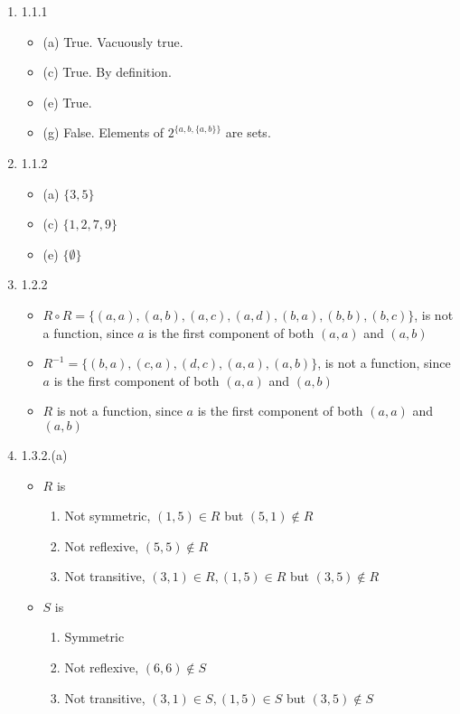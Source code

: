 \documentclass[10pt,a4paper]{article}
\begin{document}
\begin{enumerate}
	\item 1.1.1
	\begin{itemize}
		\item (a) True. Vacuously true.
		\item (c) True. By definition.
		\item (e) True.
		\item (g) False. Elements of $2^{\{a,b,\{a,b\}\}}$ are sets.
	\end{itemize}
	\item 1.1.2
	\begin{itemize}
		\item (a) $\{3,5\}$
		\item (c) $\{1,2,7,9\}$
		\item (e) $\{\emptyset\}$
	\end{itemize}
	\item 1.2.2
	\begin{itemize}
	\item $R\circ R=\{(a,a),(a,b),(a,c),(a,d),(b,a),(b,b),(b,c)\}$, is not a function, since $a$ is the first component of both $(a,a)$ and $(a,b)$
	\item $R^{-1}=\{(b,a),(c,a),(d,c),(a,a),(a,b)\}$, is not a function, since $a$ is the first component of both $(a,a)$ and $(a,b)$
	\item $R$ is not a function, since $a$ is the first component of both $(a,a)$ and $(a,b)$
	\end{itemize}	
	\item 1.3.2.(a)
	\begin{itemize}
		\item $R$ is 
		\begin{enumerate}
			\item Not symmetric, $(1,5)\in R$ but $(5,1)\notin R$
			\item Not reflexive, $(5,5)\notin R$
			\item Not transitive, $(3,1)\in R,(1,5)\in R$ but $(3,5)\notin R$
		\end{enumerate}
		\item $S$ is 
		\begin{enumerate}
			\item Symmetric
			\item Not reflexive, $(6,6)\notin S$
			\item Not transitive, $(3,1)\in S,(1,5)\in S$ but $(3,5)\notin S$
		\end{enumerate}
	\end{itemize}
\end{enumerate}
\end{document}
